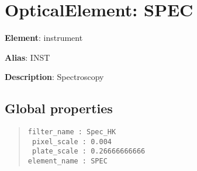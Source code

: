 

\section{OpticalElement: \textquotedbl{}SPEC\textquotedbl{}%
  \label{opticalelement-spec}%
}

\textbf{Element}: instrument

\textbf{Alias}: INST

\textbf{Description}: Spectroscopy


\subsection{Global properties%
  \label{global-properties}%
}

\begin{quote}
\begin{alltt}
\begin{lstlisting}[frame=single]
 filter_name : Spec_HK
 pixel_scale : 0.004
 plate_scale : 0.26666666666
element_name : SPEC
\end{lstlisting}
\end{alltt}
\end{quote}

